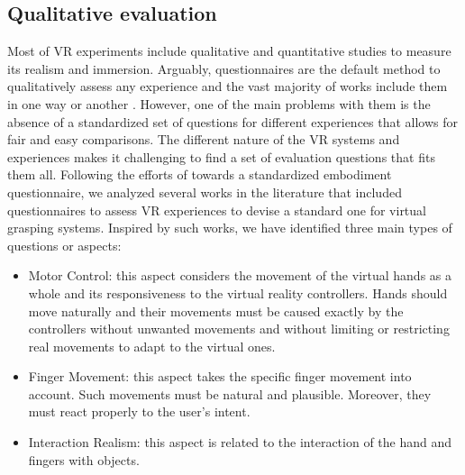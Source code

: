 \subsection{Qualitative evaluation}
\label{subsec:qualitative}

Most of VR experiments include qualitative and quantitative studies to measure its realism and immersion. Arguably, questionnaires are the default method to qualitatively assess any experience and the vast majority of works include them in one way or another \cite{Christopoulos2018} \cite{Koutsabasis2018} \cite{Vosinakis2018}. However, one of the main problems with them is the absence of a standardized set of questions for different experiences that allows for fair and easy comparisons. The different nature of the VR systems and experiences makes it challenging to find a set of evaluation questions that fits them all. Following the efforts of \cite{Gonzalez-Franco2018} towards a standardized embodiment questionnaire, we analyzed several works in the literature \cite{Poeschl2013} \cite{Brackney2017} that included questionnaires to assess VR experiences to devise a standard one for virtual grasping systems. Inspired by such works, we have identified three main types of questions or aspects:
\begin{itemize}
	\item Motor Control: this aspect considers the movement of the virtual hands as a whole and its responsiveness to the virtual reality controllers. Hands should move naturally and their movements must be caused exactly by the controllers without unwanted movements and without limiting or restricting real movements to adapt to the virtual ones.
	\item Finger Movement: this aspect takes the specific finger movement into account. Such movements must be natural and plausible. Moreover, they must react properly to the user's intent.
	\item Interaction Realism: this aspect is related to the interaction of the hand and fingers with objects. 
\end{itemize}

